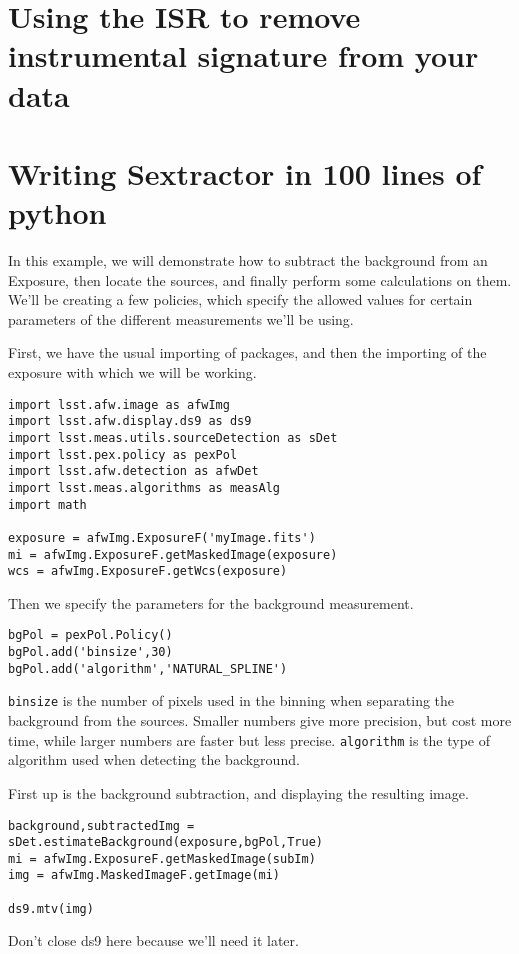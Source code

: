 
\section{Using the ISR to remove instrumental signature from your data}

\section{Writing Sextractor in 100 lines of python}


In this example, we will demonstrate how to subtract the background from an Exposure, then locate the sources, and finally perform some calculations on them.  We'll be creating a few policies, which specify the allowed values for certain parameters of the different measurements we'll be using.

First, we have the usual importing of packages, and then the importing of the exposure with which we will be working.

\begin{verbatim}
import lsst.afw.image as afwImg
import lsst.afw.display.ds9 as ds9
import lsst.meas.utils.sourceDetection as sDet
import lsst.pex.policy as pexPol
import lsst.afw.detection as afwDet
import lsst.meas.algorithms as measAlg
import math

exposure = afwImg.ExposureF('myImage.fits')
mi = afwImg.ExposureF.getMaskedImage(exposure)
wcs = afwImg.ExposureF.getWcs(exposure)
\end{verbatim}

Then we specify the parameters for the background measurement.
\begin{verbatim}
bgPol = pexPol.Policy()
bgPol.add('binsize',30)
bgPol.add('algorithm','NATURAL_SPLINE')
\end{verbatim}

\texttt{binsize} is the number of pixels used in the binning when separating the background from the sources.  Smaller numbers give more precision, but cost more time, while larger numbers are faster but less precise.  \texttt{algorithm} is the  type of algorithm used when detecting the background.

First up is the background subtraction, and displaying the resulting image.
\begin{verbatim}
background,subtractedImg = sDet.estimateBackground(exposure,bgPol,True)
mi = afwImg.ExposureF.getMaskedImage(subIm)
img = afwImg.MaskedImageF.getImage(mi)

ds9.mtv(img)
\end{verbatim}
Don't close ds9 here because we'll need it later.


